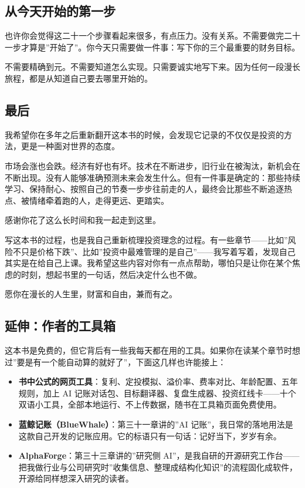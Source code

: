\documentclass[a4paper,11pt,oneside,fontset=none,UTF8,zihao=-4]{ctexbook}
\providecommand{\tightlist}{\setlength{\itemsep}{2pt}\setlength{\parskip}{1pt}}
\begin{document}
\subsection{从今天开始的第一步}\label{ux4eceux4ecaux5929ux5f00ux59cbux7684ux7b2cux4e00ux6b65}

也许你会觉得这二十一个步骤看起来很多，有点压力。没有关系。不需要做完二十一步才算是''开始了''。你今天只需要做一件事：写下你的三个最重要的财务目标。

不需要精确到元。不需要知道怎么实现。只需要诚实地写下来。因为任何一段漫长旅程，都是从知道自己要去哪里开始的。

\subsection{最后}\label{ux6700ux540e}

我希望你在多年之后重新翻开这本书的时候，会发现它记录的不仅仅是投资的方法，更是一种面对世界的态度。

市场会涨也会跌。经济有好也有坏。技术在不断进步，旧行业在被淘汰，新机会在不断出现。没有人能够准确预测未来会发生什么。但有一件事是确定的：那些持续学习、保持耐心、按照自己的节奏一步步往前走的人，最终会比那些不断追逐热点、被情绪牵着跑的人，走得更远、更踏实。

感谢你花了这么长时间和我一起走到这里。

写这本书的过程，也是我自己重新梳理投资理念的过程。有一些章节------比如''风险不只是价格下跌''、比如''投资中最难管理的是自己''------我写着写着，发现自己其实是在给自己上课。我希望这些内容对你有一点点帮助，哪怕只是让你在某个焦虑的时刻，想起书里的一句话，然后决定什么也不做。

愿你在漫长的人生里，财富和自由，兼而有之。

\subsection{延伸：作者的工具箱}\label{ux5ef6ux4f38ux4f5cux8005ux7684ux5de5ux5177ux7bb1}

这本书是免费的，但它背后有一些我每天都在用的工具。如果你在读某个章节时想过''要是有一个能自动算的就好了''，下面这几样也许能接上：

\begin{itemize}
\tightlist
\item
  \textbf{书中公式的网页工具}：复利、定投模拟、溢价率、费率对比、年龄配置、五年规则，加上
  AI
  记账对话包、目标翻译器、复盘生成器、投资红线卡------十个双语小工具，全部本地运行、不上传数据，随书在工具箱页面免费使用。
\item
  \textbf{蓝鲸记账（BlueWhale）}：第三十一章讲的''AI
  记账''，我日常的落地用法是这款自己开发的记账应用。它的标语只有一句话：记好当下，岁岁有余。
\item
  \textbf{AlphaForge}：第三十三章讲的''研究侧
  AI''，是我自研的开源研究工作台------把我做行业与公司研究时''收集信息、整理成结构化知识''的流程固化成软件，开源给同样想深入研究的读者。
\end{itemize}
\end{document}
